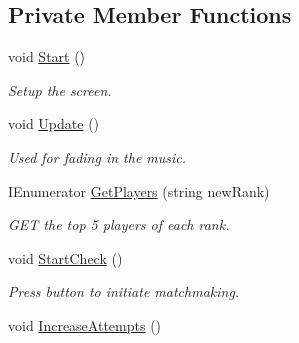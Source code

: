 \subsection*{Private Member Functions}
\begin{DoxyCompactItemize}
\item 
\mbox{\label{class_ranked_match_screen_a98bbe7478a312eca3e6b43bf452f4923}} 
void \mbox{\hyperlink{class_ranked_match_screen_a98bbe7478a312eca3e6b43bf452f4923}{Start}} ()
\begin{DoxyCompactList}\small\item\em Setup the screen. \end{DoxyCompactList}\item 
\mbox{\label{class_ranked_match_screen_ab11c2f202db041f75bf5efbd8063f2f2}} 
void \mbox{\hyperlink{class_ranked_match_screen_ab11c2f202db041f75bf5efbd8063f2f2}{Update}} ()
\begin{DoxyCompactList}\small\item\em Used for fading in the music. \end{DoxyCompactList}\item 
\mbox{\label{class_ranked_match_screen_ac556e6c839f3ed858ee7120291bf84bd}} 
I\+Enumerator \mbox{\hyperlink{class_ranked_match_screen_ac556e6c839f3ed858ee7120291bf84bd}{Get\+Players}} (string new\+Rank)
\begin{DoxyCompactList}\small\item\em G\+ET the top 5 players of each rank. \end{DoxyCompactList}\item 
\mbox{\label{class_ranked_match_screen_af680a685d6adae7f7c9580a04eea4bed}} 
void \mbox{\hyperlink{class_ranked_match_screen_af680a685d6adae7f7c9580a04eea4bed}{Start\+Check}} ()
\begin{DoxyCompactList}\small\item\em Press button to initiate matchmaking. \end{DoxyCompactList}\item 
\mbox{\label{class_ranked_match_screen_a8c3dcce8a497dddd00881d64690be6df}} 
void \mbox{\hyperlink{class_ranked_match_screen_a8c3dcce8a497dddd00881d64690be6df}{Increase\+Attempts}} ()

\end{DoxyCompactItemize}
